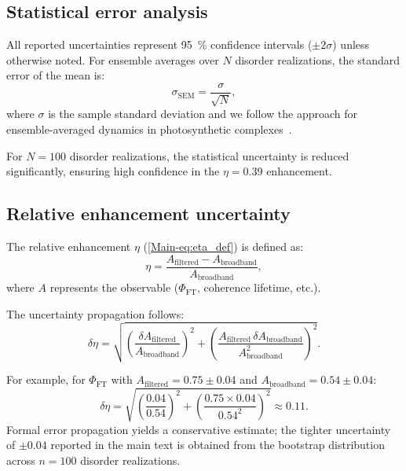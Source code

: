 \documentclass[11pt,a4paper]{article}
\begin{document}
\subsection{Statistical error analysis}

All reported uncertainties represent \SI{95}{\percent} confidence intervals ($\pm 2\sigma$) unless otherwise noted. For ensemble averages over $N$ disorder realizations, the standard error of the mean is:
\begin{equation}
\sigma_{\mathrm{SEM}} = \frac{\sigma}{\sqrt{N}},
\label{eq:SEM}
\end{equation}
where $\sigma$ is the sample standard deviation and we follow the approach for ensemble-averaged dynamics in photosynthetic complexes~\cite{Moix2011}.

For $N = 100$ disorder realizations, the statistical uncertainty is reduced significantly, ensuring high confidence in the $\eta = 0.39$ enhancement.

\subsection{Relative enhancement uncertainty}

The relative enhancement $\eta$ (\cref{Main-eq:eta_def}) is defined as:
\begin{equation}
\eta = \frac{A_{\mathrm{filtered}} - A_{\mathrm{broadband}}}{A_{\mathrm{broadband}}},
\label{eq:SI_eta_def}
\end{equation}
where $A$ represents the observable ($\Phi_{\mathrm{FT}}$, coherence lifetime, etc.).

The uncertainty propagation follows:
\begin{equation}
\delta\eta = \sqrt{\left(\frac{\delta A_{\mathrm{filtered}}}{A_{\mathrm{broadband}}}\right)^2 + \left(\frac{A_{\mathrm{filtered}} \, \delta A_{\mathrm{broadband}}}{A_{\mathrm{broadband}}^2}\right)^2}.
\label{eq:error_propagation}
\end{equation}

For example, for $\Phi_{\mathrm{FT}}$ with $A_{\mathrm{filtered}} = 0.75 \pm 0.04$ and $A_{\mathrm{broadband}} = 0.54 \pm 0.04$:
\begin{equation}
\delta\eta = \sqrt{\left(\frac{0.04}{0.54}\right)^2 + \left(\frac{0.75 \times 0.04}{0.54^2}\right)^2} \approx 0.11.
\end{equation}
Formal error propagation yields a conservative estimate; the tighter uncertainty of $\pm 0.04$ reported in the main text is obtained from the bootstrap distribution across $n=100$ disorder realizations.
\end{document}
